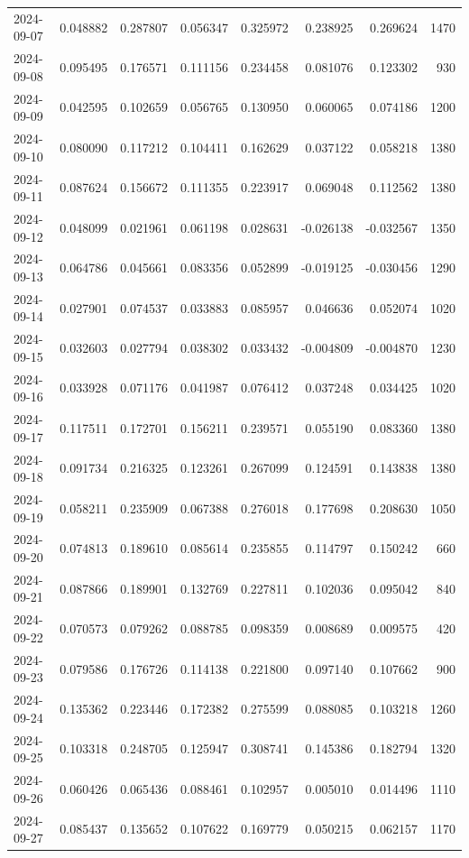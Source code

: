 \begin{tabular}{lrrrrrrr}
2024-09-07 & 0.048882 & 0.287807 & 0.056347 & 0.325972 & 0.238925 & 0.269624 & 1470 \\
2024-09-08 & 0.095495 & 0.176571 & 0.111156 & 0.234458 & 0.081076 & 0.123302 & 930 \\
2024-09-09 & 0.042595 & 0.102659 & 0.056765 & 0.130950 & 0.060065 & 0.074186 & 1200 \\
2024-09-10 & 0.080090 & 0.117212 & 0.104411 & 0.162629 & 0.037122 & 0.058218 & 1380 \\
2024-09-11 & 0.087624 & 0.156672 & 0.111355 & 0.223917 & 0.069048 & 0.112562 & 1380 \\
2024-09-12 & 0.048099 & 0.021961 & 0.061198 & 0.028631 & -0.026138 & -0.032567 & 1350 \\
2024-09-13 & 0.064786 & 0.045661 & 0.083356 & 0.052899 & -0.019125 & -0.030456 & 1290 \\
2024-09-14 & 0.027901 & 0.074537 & 0.033883 & 0.085957 & 0.046636 & 0.052074 & 1020 \\
2024-09-15 & 0.032603 & 0.027794 & 0.038302 & 0.033432 & -0.004809 & -0.004870 & 1230 \\
2024-09-16 & 0.033928 & 0.071176 & 0.041987 & 0.076412 & 0.037248 & 0.034425 & 1020 \\
2024-09-17 & 0.117511 & 0.172701 & 0.156211 & 0.239571 & 0.055190 & 0.083360 & 1380 \\
2024-09-18 & 0.091734 & 0.216325 & 0.123261 & 0.267099 & 0.124591 & 0.143838 & 1380 \\
2024-09-19 & 0.058211 & 0.235909 & 0.067388 & 0.276018 & 0.177698 & 0.208630 & 1050 \\
2024-09-20 & 0.074813 & 0.189610 & 0.085614 & 0.235855 & 0.114797 & 0.150242 & 660 \\
2024-09-21 & 0.087866 & 0.189901 & 0.132769 & 0.227811 & 0.102036 & 0.095042 & 840 \\
2024-09-22 & 0.070573 & 0.079262 & 0.088785 & 0.098359 & 0.008689 & 0.009575 & 420 \\
2024-09-23 & 0.079586 & 0.176726 & 0.114138 & 0.221800 & 0.097140 & 0.107662 & 900 \\
2024-09-24 & 0.135362 & 0.223446 & 0.172382 & 0.275599 & 0.088085 & 0.103218 & 1260 \\
2024-09-25 & 0.103318 & 0.248705 & 0.125947 & 0.308741 & 0.145386 & 0.182794 & 1320 \\
2024-09-26 & 0.060426 & 0.065436 & 0.088461 & 0.102957 & 0.005010 & 0.014496 & 1110 \\
2024-09-27 & 0.085437 & 0.135652 & 0.107622 & 0.169779 & 0.050215 & 0.062157 & 1170 \\

\end{tabular}
